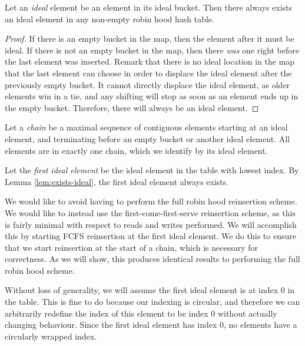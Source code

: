 \documentclass{cccg13}
\begin{document}
\begin{lemma} \label{lem:exists-ideal}
  Let an \emph{ideal} element be an element in its ideal bucket. Then there
  always exists an ideal element in any non-empty robin hood hash table.
\end{lemma}

\begin{proof}
  If there is an empty bucket in the map, then the element after it must be
  ideal. If there is not an empty bucket in the map, then there \emph{was} one
  right before the last element was inserted. Remark that there is no ideal
  location in the map that the last element can choose in order to displace
  the ideal element after the previously empty bucket. It cannot directly
  displace the ideal element, as older elements win in a tie, and any shifting
  will stop as soon as an element ends up in the empty bucket. Therefore,
  there will always be an ideal element.
\end{proof}

\begin{defn}
  Let a \emph{chain} be a maximal sequence of contiguous elements starting at
  an ideal element, and terminating before an empty bucket or another ideal
  element. All elements are in exactly one chain, which we identify by its
  ideal element.
\end{defn}

\begin{defn}
  Let the \emph{first ideal element} be the ideal element in the table with
  lowest index. By Lemma \ref{lem:exists-ideal}, the first ideal element
  always exists.
\end{defn}

We would like to avoid having to perform the full robin hood reinsertion
scheme. We would like to instead use the first-come-first-serve reinsertion
scheme, as this is fairly minimal with respect to reads and writes performed.
We will accomplish this by starting FCFS reinsertion at the first ideal
element. We do this to ensure that we start reinsertion at the start of a
chain, which is necessary for correctness. As we will show, this produces
identical results to performing the full robin hood scheme.

Without loss of generality, we will assume the first ideal element is at index
$0$ in the table. This is fine to do because our indexing is circular, and
therefore we can arbitrarily redefine the index of this element to be index
$0$ without actually changing behaviour. Since the first ideal element has
index $0$, no elements have a circularly wrapped index.
\end{document}

